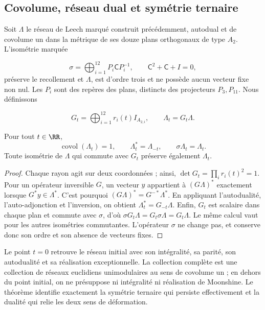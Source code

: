 \subsection{Covolume, réseau dual et symétrie ternaire
}

Soit \(\Lambda\) le réseau de Leech marqué construit précédemment, autodual et de covolume un dans la métrique de ses douze plans orthogonaux de type \(A_2\). L’isométrie marquée

\[
 \sigma=\bigoplus_{i=1}^{12}P_i\mathsf C P_i^{-1},\qquad
 \mathsf C^2+\mathsf C+I=0,
\]
préserve le recollement et \(\Lambda\), est d’ordre trois et ne possède aucun vecteur fixe non nul. Les \(P_i\) sont des repères des plans, distincts des projecteurs \(P_3,P_{11}\). Nous définissons

\begin{equation}
 G_t=\bigoplus_{i=1}^{12}r_i(t)I_{A_{2,i}},\qquad
 \Lambda_t=G_t\Lambda.
 \label{rec:eq:red}
\end{equation}

\begin{theorem}
\label{rec:thm:red}
Pour tout \(t\in\RR\),
\[
 \operatorname{covol}(\Lambda_t)=1,\qquad
 \Lambda_t^*=\Lambda_{-t},\qquad \sigma\Lambda_t=\Lambda_t.
\]
Toute isométrie de \(\Lambda\) qui commute avec \(G_t\) préserve également \(\Lambda_t\).
\end{theorem}
\begin{proof}
Chaque rayon agit sur deux coordonnées ; ainsi,
\(\det G_t=\prod_i r_i(t)^2=1\). Pour un opérateur inversible \(G\), un vecteur \(y\) appartient à \((G\Lambda)^*\) exactement lorsque \(G^*y\in\Lambda^*\). C’est pourquoi
\((G\Lambda)^*=G^{-*}\Lambda^*\). En appliquant l’autodualité, l’auto-adjonction et l’inversion, on obtient \(\Lambda_t^*=G_{-t}\Lambda\). Enfin, \(G_t\) est scalaire dans chaque plan et commute avec \(\sigma\), d’où
\(\sigma G_t\Lambda=G_t\sigma\Lambda=G_t\Lambda\). Le même calcul vaut pour les autres isométries commutantes. L’opérateur \(\sigma\) ne change pas, et conserve donc son ordre et son absence de vecteurs fixes.
\end{proof}

Le point \(t=0\) retrouve le réseau initial avec son intégralité, sa parité, son autodualité et sa réalisation exceptionnelle. La collection complète est une collection de réseaux euclidiens unimodulaires au sens de covolume un ; en dehors du point initial, on ne présuppose ni intégralité ni réalisation de Moonshine. Le théorème identifie exactement la symétrie ternaire qui persiste effectivement et la dualité qui relie les deux sens de déformation.

